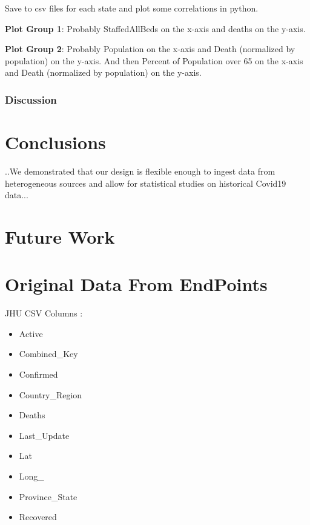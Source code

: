 \documentclass[11pt]{article}
\newcommand{\comment}[1]{{\color{red}{#1}}}
\begin{document}
\noindent
Save to csv files for each state and plot some correlations in python.

\noindent
\textbf{Plot Group 1}: Probably StaffedAllBeds on the x-axis and deaths on the y-axis.

\noindent
\textbf{Plot Group 2}: Probably Population on the x-axis and Death (normalized by population) on the y-axis. And then Percent of Population over 65 on the x-axis and Death (normalized by population) on the y-axis.

\subsubsection{Discussion}

\pagebreak

\section{Conclusions}
..We demonstrated that our design is flexible enough to ingest data from heterogeneous sources and allow for statistical studies on historical Covid19 data...
\section{Future Work}



\appendix

\section{Original Data From EndPoints}

\noindent
JHU CSV Columns :

\begin{itemize}
    \item Active
    \item Combined\_Key
    \item Confirmed
    \item Country\_Region
    \item Deaths
    \item Last\_Update
    \item Lat
    \item Long\_
    \item Province\_State
    \item Recovered
\end{itemize}
\end{document}
